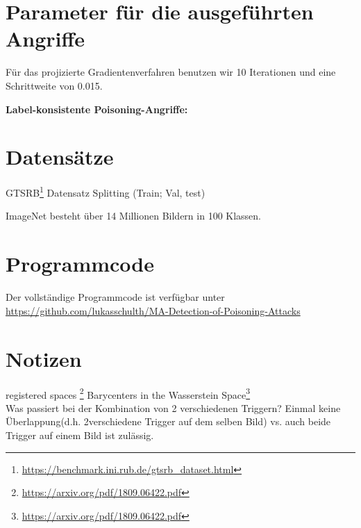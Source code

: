 \documentclass[11pt,a4paper]{article}
\numberwithin{equation}{section}
\begin{document}
	
	\section{Parameter für die ausgeführten Angriffe}\label{param_attacks}
	Für das projizierte Gradientenverfahren benutzen wir 10 Iterationen und eine Schrittweite von 0.015.
	
	\textbf{Label-konsistente Poisoning-Angriffe:}
	\section{Datensätze}
	GTSRB\footnote{\url{https://benchmark.ini.rub.de/gtsrb_dataset.html}}
	Datensatz Splitting (Train; Val, test)
	
	ImageNet besteht über 14 Millionen Bildern in 100 Klassen.
	\section{Programmcode}
	Der vollständige Programmcode ist verfügbar unter \url{https://github.com/lukasschulth/MA-Detection-of-Poisoning-Attacks}
	
	
	\section{Notizen}
	registered spaces \footnote{\url{https://arxiv.org/pdf/1809.06422.pdf}}
	Barycenters in the Wasserstein Space\footnote{\url{https://arxiv.org/pdf/1809.06422.pdf}}\\
	Was passiert bei der Kombination von 2 verschiedenen Triggern? Einmal keine Überlappung(d.h. 2verschiedene Trigger auf dem selben Bild) vs. auch beide Trigger auf einem Bild ist zulässig.
	\newpage
	
	\printglossaries
	
	\newpage
	
	
	
	
	
	
	
\end{document}
